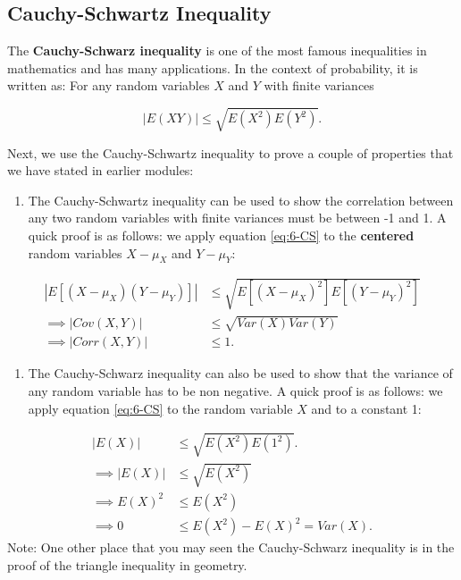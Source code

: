 \documentclass[
]{book}
\providecommand{\tightlist}{%
  \setlength{\itemsep}{0pt}\setlength{\parskip}{0pt}}
\begin{document}
\subsection{Cauchy-Schwartz Inequality}\label{cauchy-schwartz-inequality}

The \textbf{Cauchy-Schwarz inequality} is one of the most famous inequalities in mathematics and has many applications. In the context of probability, it is written as: For any random variables \(X\) and \(Y\) with finite variances

\begin{equation} 
|E(XY)| \leq \sqrt{E(X^2)E(Y^2)}.
\label{eq:6-CS}
\end{equation}

Next, we use the Cauchy-Schwartz inequality to prove a couple of properties that we have stated in earlier modules:

\begin{enumerate}
\def\labelenumi{\arabic{enumi}.}
\tightlist
\item
  The Cauchy-Schwartz inequality can be used to show the correlation between any two random variables with finite variances must be between -1 and 1. A quick proof is as follows: we apply equation \eqref{eq:6-CS} to the \textbf{centered} random variables \(X - \mu_X\) and \(Y - \mu_Y\):
\end{enumerate}

\[
\begin{split}
|E[(X - \mu_X)(Y - \mu_Y)]| & \leq \sqrt{E[(X - \mu_X)^2] E[(Y - \mu_Y)^2]} \\
\implies |Cov(X,Y)| & \leq \sqrt{Var(X) Var(Y)} \\
\implies |Corr(X,Y)| & \leq 1.
\end{split}
\]

\begin{enumerate}
\def\labelenumi{\arabic{enumi}.}
\setcounter{enumi}{1}
\tightlist
\item
  The Cauchy-Schwarz inequality can also be used to show that the variance of any random variable has to be non negative. A quick proof is as follows: we apply equation \eqref{eq:6-CS} to the random variable \(X\) and to a constant 1:
\end{enumerate}

\[
\begin{split}
|E(X)| & \leq \sqrt{E(X^2)E(1^2)}. \\
\implies |E(X)| & \leq \sqrt{E(X^2)} \\
\implies E(X)^2 & \leq E(X^2) \\
\implies 0 & \leq E(X^2) - E(X)^2 = Var(X).
\end{split}
\]
Note: One other place that you may seen the Cauchy-Schwarz inequality is in the proof of the triangle inequality in geometry.
\end{document}
